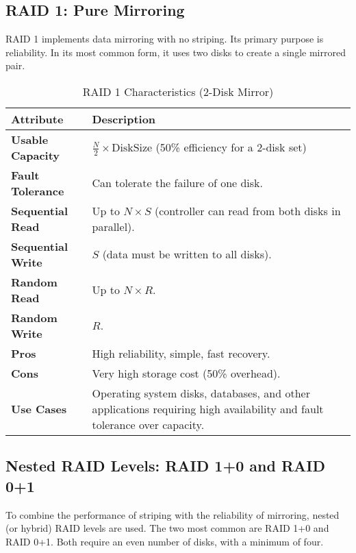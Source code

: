 \documentclass[12pt]{article}
\begin{document}
\subsection{RAID 1: Pure Mirroring}
RAID 1 implements data mirroring with no striping. Its primary purpose is reliability. In its most common form, it uses two disks to create a single mirrored pair.

\begin{table}[h!]
\centering
\caption{RAID 1 Characteristics (2-Disk Mirror)}
\label{tab:raid1}
\begin{tabular}{>{\raggedright\arraybackslash}p{4cm} >{\raggedright\arraybackslash}p{8cm}}
\toprule
\textbf{Attribute} & \textbf{Description} \\
\midrule
\textbf{Usable Capacity} & $\frac{N}{2} \times \text{DiskSize}$ (50\% efficiency for a 2-disk set) \\
\textbf{Fault Tolerance} & Can tolerate the failure of one disk. \\
\textbf{Sequential Read} & Up to $N \times S$ (controller can read from both disks in parallel). \\
\textbf{Sequential Write} & $S$ (data must be written to all disks). \\
\textbf{Random Read} & Up to $N \times R$. \\
\textbf{Random Write} & $R$. \\
\textbf{Pros} & High reliability, simple, fast recovery. \\
\textbf{Cons} & Very high storage cost (50\% overhead). \\
\textbf{Use Cases} & Operating system disks, databases, and other applications requiring high availability and fault tolerance over capacity. \\
\bottomrule
\end{tabular}
\end{table}

\newpage
\subsection{Nested RAID Levels: RAID 1+0 and RAID 0+1}
To combine the performance of striping with the reliability of mirroring, nested (or hybrid) RAID levels are used. The two most common are RAID 1+0 and RAID 0+1. Both require an even number of disks, with a minimum of four.
\end{document}
